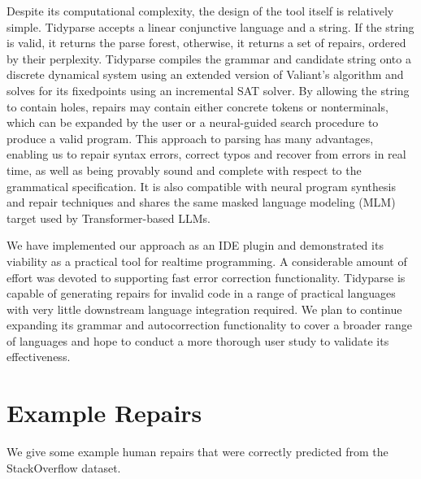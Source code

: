 \documentclass[sigplan,review,anonymous,acmsmall]{acmart}\settopmatter{printfolios=false,printccs=false,printacmref=false}
\begin{document}
Despite its computational complexity, the design of the tool itself is relatively simple. Tidyparse accepts a linear conjunctive language and a string. If the string is valid, it returns the parse forest, otherwise, it returns a set of repairs, ordered by their perplexity. Tidyparse compiles the grammar and candidate string onto a discrete dynamical system using an extended version of Valiant's algorithm and solves for its fixedpoints using an incremental SAT solver. By allowing the string to contain holes, repairs may contain either concrete tokens or nonterminals, which can be expanded by the user or a neural-guided search procedure to produce a valid program. This approach to parsing has many advantages, enabling us to repair syntax errors, correct typos and recover from errors in real time, as well as being provably sound and complete with respect to the grammatical specification. It is also compatible with neural program synthesis and repair techniques and shares the same masked language modeling (MLM) target used by Transformer-based LLMs.

We have implemented our approach as an IDE plugin and demonstrated its viability as a practical tool for realtime programming. A considerable amount of effort was devoted to supporting fast error correction functionality. Tidyparse is capable of generating repairs for invalid code in a range of practical languages with very little downstream language integration required. We plan to continue expanding its grammar and autocorrection functionality to cover a broader range of languages and hope to conduct a more thorough user study to validate its effectiveness.



\appendix

\pagebreak\section{Example Repairs}\label{sec:appendix}

We give some example human repairs that were correctly predicted from the StackOverflow dataset.
\end{document}
